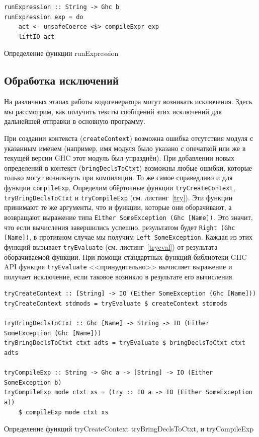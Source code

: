 \begin{ListingEnv}
	\begin{lstlisting}
runExpression :: String -> Ghc b
runExpression exp = do
    act <- unsafeCoerce <$> compileExpr exp
    liftIO act
	\end{lstlisting}
	\caption{Определение функции runExpression}\label{runexp}
\end{ListingEnv}
	
	\subsection{Обработка исключений}
	На различных этапах работы кодогенератора могут возникать исключения. Здесь мы рассмотрим, как получить тексты сообщений этих исключений для дальнейшей отправки в основную программу.
	
	При создании контекста (\lstinline!createContext!) возможна ошибка отсутствия модуля с указанным именем (например, имя модуля было указано с опечаткой или же в текущей версии GHC этот модуль был упразднён). При добавлении новых определений в контекст (\lstinline!bringDeclsToCtxt!) возможны любые ошибки, которые только могут возникнуть при компиляции. То же самое справедливо и для функции \lstinline!compileExp!. Определим обёрточные функции \lstinline!tryCreateContext!, \lstinline!tryBringDeclsToCtxt! и \lstinline!tryCompileExp! (см. листинг~\ref{try}). Эти функции принимают те же аргументы, что и функции, которые они оборачивают, а возвращают выражение типа \lstinline!Either SomeException (Ghc [Name])!. Это значит, что если вычисления завершились успешно, результатом будет \lstinline!Right (Ghc [Name])!, в противном случае мы получим \lstinline!Left SomeException!. Каждая из этих функций вызывает \lstinline!tryEvaluate! (см. листинг~\ref{tryeval}) от результата оборачиваемой функции. При помощи стандартных функций библиотеки GHC API функция \lstinline!tryEvaluate! <<принудительно>> вычисляет выражение и получает исключение, если таковое возникло в результате его вычисления.

\begin{ListingEnv}[h]
	\begin{lstlisting}
tryCreateContext :: [String] -> IO (Either SomeException (Ghc [Name]))
tryCreateContext stdmods = tryEvaluate $ createContext stdmods

tryBringDeclsToCtxt :: Ghc [Name] -> String -> IO (Either SomeException (Ghc [Name]))
tryBringDeclsToCtxt ctxt adts = tryEvaluate $ bringDeclsToCtxt ctxt adts

tryCompileExp :: String -> Ghc a -> [String] -> IO (Either SomeException b)
tryCompileExp mode ctxt xs = (try :: IO a -> IO (Either SomeException a))
	$ compileExp mode ctxt xs
	\end{lstlisting}
	\caption{Определение функций tryCreateContext tryBringDeclsToCtxt, и tryCompileExp}\label{try}
\end{ListingEnv}	

